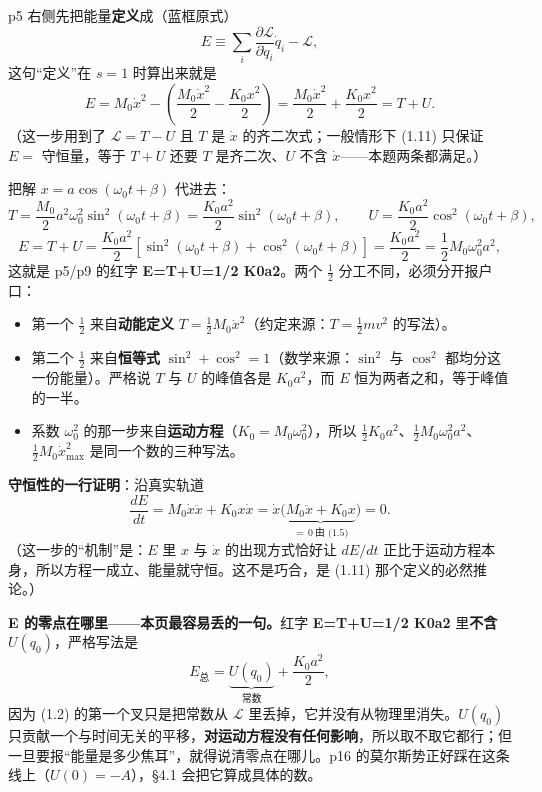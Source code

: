 \documentclass[11pt]{ctexart}
\begin{document}

p5 右侧先把能量\textbf{定义}成（蓝框原式）
\[
E\equiv\sum_i\frac{\partial\mathcal{L}}{\partial\dot q_i}\dot q_i-\mathcal{L},
\tag{1.11}
\]
这句“定义”在 $s=1$ 时算出来就是
\[
E=M_0\dot x^2-\left(\frac{M_0\dot x^2}{2}-\frac{K_0x^2}{2}\right)=\frac{M_0\dot x^2}{2}+\frac{K_0x^2}{2}=T+U .
\]
（这一步用到了 $\mathcal{L}=T-U$ 且 $T$ 是 $\dot x$ 的齐二次式；一般情形下 (1.11) 只保证 $E=$ 守恒量，等于 $T+U$ 还要 $T$ 是齐二次、$U$ 不含 $\dot x$——本题两条都满足。）

把解 $x=a\cos(\omega_0t+\beta)$ 代进去：
\[
T=\frac{M_0}{2}a^2\omega_0^2\sin^2(\omega_0t+\beta)=\frac{K_0a^2}{2}\sin^2(\omega_0t+\beta),\qquad
U=\frac{K_0a^2}{2}\cos^2(\omega_0t+\beta),
\]
\[
E=T+U=\frac{K_0a^2}{2}\left[\sin^2(\omega_0t+\beta)+\cos^2(\omega_0t+\beta)\right]=\frac{K_0a^2}{2}=\frac12M_0\omega_0^2a^2 ,
\tag{1.12}
\]
这就是 p5/p9 的红字 \textbf{E=T+U=1/2 K0a2}。两个 $\frac12$ 分工不同，必须分开报户口：

\begin{itemize}
\item 第一个 $\frac12$ 来自\textbf{动能定义} $T=\frac12M_0\dot x^2$（约定来源：$T=\frac12mv^2$ 的写法）。
\item 第二个 $\frac12$ 来自\textbf{恒等式} $\sin^2+\cos^2=1$（数学来源：$\sin^2$ 与 $\cos^2$ 都均分这一份能量）。严格说 $T$ 与 $U$ 的峰值各是 $K_0a^2$，而 $E$ 恒为两者之和，等于峰值的一半。
\item 系数 $\omega_0^2$ 的那一步来自\textbf{运动方程}（$K_0=M_0\omega_0^2$），所以 $\frac12K_0a^2$、$\frac12M_0\omega_0^2a^2$、$\frac12M_0\dot x_{\max}^2$ 是同一个数的三种写法。
\end{itemize}

\textbf{守恒性的一行证明}：沿真实轨道
\[
\frac{dE}{dt}=M_0\dot x\ddot x+K_0x\dot x=\dot x\bigl(\underbrace{M_0\ddot x+K_0x}_{=\,0\ \text{由 (1.5)}}\bigr)=0 .
\tag{1.13}
\]
（这一步的“机制”是：$E$ 里 $x$ 与 $\dot x$ 的出现方式恰好让 $dE/dt$ 正比于运动方程本身，所以方程一成立、能量就守恒。这不是巧合，是 (1.11) 那个定义的必然推论。）

\textbf{E 的零点在哪里——本页最容易丢的一句。}红字 \textbf{E=T+U=1/2 K0a2} 里\textbf{不含 $U(q_0)$}，严格写法是
\[
E_{\text{总}}=\underbrace{U(q_0)}_{\text{常数}}+\frac{K_0a^2}{2},
\tag{1.14}
\]
因为 (1.2) 的第一个叉只是把常数从 $\mathcal{L}$ 里丢掉，它并没有从物理里消失。$U(q_0)$ 只贡献一个与时间无关的平移，\textbf{对运动方程没有任何影响}，所以取不取它都行；但一旦要报“能量是多少焦耳”，就得说清零点在哪儿。p16 的莫尔斯势正好踩在这条线上（$U(0)=-A$），§4.1 会把它算成具体的数。
\end{document}

